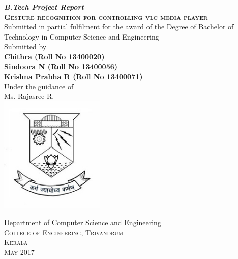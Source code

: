 \documentclass[a4paper,11pt]{article}
\begin{document}
	\begin{titlepage}
		\begin{centering}
		 
		\textbf{\textit{\large{B.Tech Project Report}}}\\[0.5cm]
		
		\textsc{\textbf{\LARGE{Gesture recognition for controlling vlc media player}}}\\[1.5cm]

		\large{Submitted in partial fulfilment for the award of the Degree of Bachelor of Technology in Computer Science and Engineering}\\[1.5cm]

		\large{Submitted by}\\[0.5cm]

		\textbf{Chithra     (Roll No 13400020)}\\
		\textbf{Sindoora N     (Roll No 13400056)}\\
		\textbf{Krishna Prabha R    (Roll No 13400071)}\\[1.5cm]
		
		{Under the guidance of}\\[0.25cm]
		\large{Ms. Rajasree R.}\\[0.5cm]

		\includegraphics[width=5cm]{images/logo.jpg} 

		Department of Computer Science and Engineering\\
		\textsc{College of Engineering, Trivandrum}\\
		\textsc{Kerala}\\
		\textsc{May 2017}\\
		\vfill %
		\end{centering}
	\end{titlepage}
\end{document}
